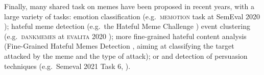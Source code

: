 Finally, many shared task on memes have been proposed in recent years, with a large variety of tasks: emotion classification (e.g.\ \textsc{memotion} task at SemEval 2020 \citealp{sharma-etal-2020-semeval}); hateful meme detection (e.g.\ the Hateful Meme Challenge \citealp{NEURIPS2020_hatefulmeme}) event clustering (e.g.\ \textsc{dankmemes} at \textsc{evalita} 2020 \cite{miliani2020dankmemes}); more fine-grained hateful content analysis (Fine-Grained Hateful Memes Detection \citealp{mathias-etal-2021-findings}, aiming at classifying the target attacked by the meme and the type of attack); or and detection of persuasion techniques (e.g.\ Semeval 2021 Task 6, \citealp{dimitrov-etal-2021-semeval}).


